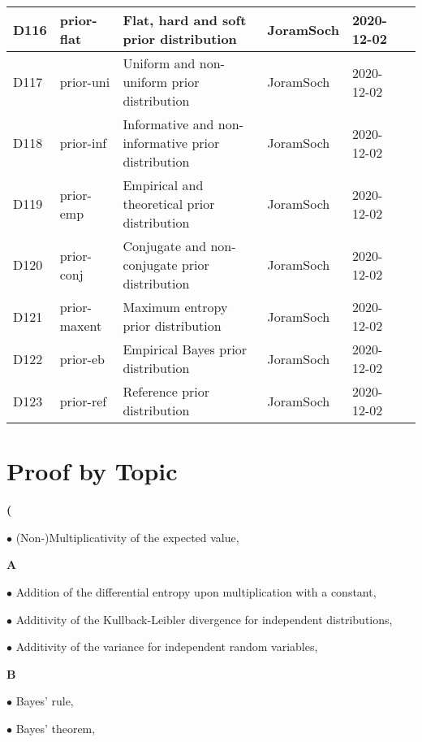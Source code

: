 \documentclass[a4paper,12pt,twoside]{book}
\begin{document}
\begin{longtable}{|p{1cm}|p{2cm}|p{6.5cm}|p{3cm}|p{2cm}|c|}
D116 & prior-flat & Flat, hard and soft prior distribution & JoramSoch & 2020-12-02 & \pageref{sec:prior-flat} \\ \hline
D117 & prior-uni & Uniform and non-uniform prior distribution & JoramSoch & 2020-12-02 & \pageref{sec:prior-uni} \\ \hline
D118 & prior-inf & Informative and non-informative prior distribution & JoramSoch & 2020-12-02 & \pageref{sec:prior-inf} \\ \hline
D119 & prior-emp & Empirical and theoretical prior distribution & JoramSoch & 2020-12-02 & \pageref{sec:prior-emp} \\ \hline
D120 & prior-conj & Conjugate and non-conjugate prior distribution & JoramSoch & 2020-12-02 & \pageref{sec:prior-conj} \\ \hline
D121 & prior-maxent & Maximum entropy prior distribution & JoramSoch & 2020-12-02 & \pageref{sec:prior-maxent} \\ \hline
D122 & prior-eb & Empirical Bayes prior distribution & JoramSoch & 2020-12-02 & \pageref{sec:prior-eb} \\ \hline
D123 & prior-ref & Reference prior distribution & JoramSoch & 2020-12-02 & \pageref{sec:prior-ref} \\ \hline
\end{longtable}



\pagebreak
\section{Proof by Topic}

\textbf{(}

$\bullet$ (Non-)Multiplicativity of the expected value, \pageref{sec:mean-mult}


\vspace{1em}
\textbf{A}

$\bullet$ Addition of the differential entropy upon multiplication with a constant, \pageref{sec:dent-add}

$\bullet$ Additivity of the Kullback-Leibler divergence for independent distributions, \pageref{sec:kl-add}

$\bullet$ Additivity of the variance for independent random variables, \pageref{sec:var-add}


\vspace{1em}
\textbf{B}

$\bullet$ Bayes' rule, \pageref{sec:bayes-rule}

$\bullet$ Bayes' theorem, \pageref{sec:bayes-th}
\end{document}
